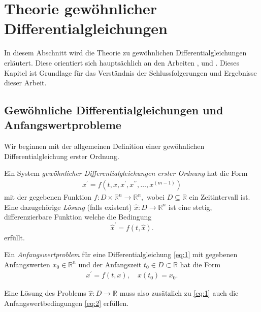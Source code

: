 \section{Theorie gewöhnlicher Differentialgleichungen}
\label{sec:theorie}
In diesem Abschnitt wird die Theorie zu gewöhnlichen Differentialgleichungen erläutert. Diese orientiert sich
hauptsächlich an den Arbeiten \cite{peterdeuflhardfolkmarbornemannNumerischeMathematikGewohnliche},
\cite{ernsthairergerhardwannerSolvingOrdinaryDifferential} und \cite{berndaulbachGewohnlicheDifferentialgleichungen2004}.
Dieses Kapitel ist Grundlage für das Verständnis der Schlussfolgerungen und Ergebnisse dieser Arbeit.

\subsection{Gewöhnliche Differentialgleichungen und Anfangswertprobleme}
Wir beginnen mit der allgemeinen Definition einer gewöhnlichen Differentialgleichung erster Ordnung.
\begin{definition}
    Ein System {\em gewöhnlicher Differentialgleichungen erster Ordnung} hat die Form
    \begin{align}
        x^{\prime} = f(t, x, x^{\prime}, x^{\prime\prime}, \dots, x^{(m-1)}) \label{eq:1}
    \end{align}
    mit der gegebenen Funktion
    $
    f : D \times \mathbb{R}^{n} \rightarrow \mathbb{R}^{n},
    $
    wobei $D \subseteq \mathbb{R}$ ein Zeitintervall ist. Eine dazugehörige {\em Lösung} (falls existent)
    $\hat{x} : D \rightarrow \mathbb{R}^n$ ist eine stetig, differenzierbare Funktion welche die Bedingung
    \[
        \hat{x}^{\prime} = f(t, \hat{x}).
    \]
    erfüllt.
\end{definition}
\begin{definition}
    Ein {\em Anfangswertproblem} für eine Differentialgleichung \eqref{eq:1} mit gegebenen Anfangswerten
    $x_{0} \in \mathbb{R}^{n}$ und der Anfangszeit $t_0 \in D \subset \mathbb{R}$ hat die Form
    \begin{align}
        x^{\prime} = f(t, x),\quad x(t_{0})=x_{0}. \label{eq:2}
    \end{align}
\end{definition}
Eine Lösung des Problems $\hat{x} : D \rightarrow \mathbb{R}$ muss also zusätzlich zu \eqref{eq:1} auch die
Anfangswertbedingungen \eqref{eq:2} erfüllen.
